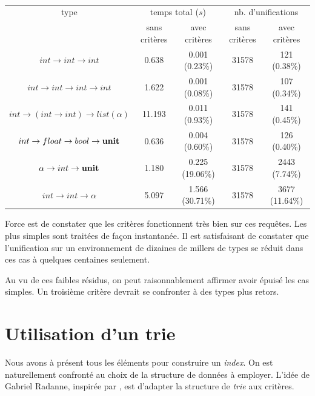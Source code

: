 \documentclass[a4paper]{report}
\theoremstyle{definition}
\begin{document}
\begin{table}[h]
	\centering
	\begin{tabular}{|*{5}{c|}}
		\hline
			type &
			\multicolumn{2}{c|}{temps total ($s$)} &
			\multicolumn{2}{c|}{nb. d'unifications}
		\\
		\cline{2-5}
			&
			sans critères & avec critères &
			sans critères & avec critères
		\\
		\hline
			$int \rightarrow int \rightarrow int$ &
			0.638 & 0.001 (0.23\%) &
			31578 & 121 (0.38\%)
		\\
			$int \rightarrow int \rightarrow int \rightarrow int$ &
			1.622 & 0.001 (0.08\%) &
			31578 & 107 (0.34\%)
		\\
			$int \rightarrow (int \rightarrow int) \rightarrow list (\alpha)$ &
			11.193 & 0.011 (0.93\%) &
			31578 & 141 (0.45\%)
		\\
			$int \rightarrow float \rightarrow bool \rightarrow \bold{unit}$ &
			0.636 & 0.004 (0.60\%) &
			31578 & 126 (0.40\%)
		\\
			$\alpha \rightarrow int \rightarrow \bold{unit}$ &
			1.180 & 0.225 (19.06\%) &
			31578 & 2443 (7.74\%)
		\\
			$int \rightarrow int \rightarrow \alpha$ &
			5.097 & 1.566 (30.71\%) &
			31578 & 3677 (11.64\%)
		\\
		\hline
	\end{tabular}
	\caption{\label{tab_apport2}}
\end{table}

Force est de constater que les critères fonctionnent très bien sur ces requêtes. Les plus simples sont traitées de façon instantanée. Il est satisfaisant de constater que l'unification sur un environnement de dizaines de millers de types se réduit dans ces cas à quelques centaines seulement.

Au vu de ces faibles résidus, on peut raisonnablement affirmer avoir épuisé les cas simples. Un troisième critère devrait se confronter à des types plus retors.


\section{Utilisation d'un trie}

Nous avons à présent tous les éléments pour construire un \emph{index}. On est naturellement confronté au choix de la structure de données à employer. L'idée de Gabriel Radanne, inspirée par \cite{Schulz}, est d'adapter la structure de \emph{trie} aux critères.
\end{document}
